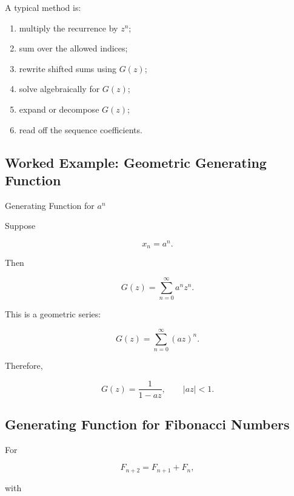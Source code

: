 A typical method is:

\begin{enumerate}
    \item multiply the recurrence by \(z^n\);
    \item sum over the allowed indices;
    \item rewrite shifted sums using \(G(z)\);
    \item solve algebraically for \(G(z)\);
    \item expand or decompose \(G(z)\);
    \item read off the sequence coefficients.
\end{enumerate}

\subsection{Worked Example: Geometric Generating Function}
\label{subsec:worked-geometric-generating-function}

\begin{workedexamplebox}{Generating Function for \(a^n\)}

Suppose

\[
x_n=a^n.
\]

Then

\[
G(z)
=
\sum_{n=0}^{\infty}
a^nz^n.
\]

This is a geometric series:

\[
G(z)
=
\sum_{n=0}^{\infty}
(az)^n.
\]

Therefore,

\begin{answerbox}
\[
\boxed{
G(z)
=
\frac1{
1-az
},
\qquad
|az|<1.
}
\]
\end{answerbox}

\end{workedexamplebox}

\subsection{Generating Function for Fibonacci Numbers}
\label{subsec:fibonacci-generating-function}

For

\[
F_{n+2}=F_{n+1}+F_n,
\]

with

